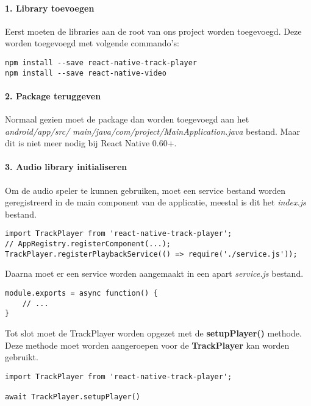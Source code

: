 \paragraph{1. Library toevoegen}
Eerst moeten de libraries aan de root van ons project worden toegevoegd. 
Deze worden toegevoegd met volgende commando's:
\begin{verbatim}
npm install --save react-native-track-player
npm install --save react-native-video
\end{verbatim}

\paragraph{2. Package teruggeven}
Normaal gezien moet de package dan worden toegevoegd aan het 
\textit{android/app/src/} \textit{main/java/com/project/MainApplication.java} bestand.
Maar dit is niet meer nodig bij React Native 0.60+.

\paragraph{3. Audio library initialiseren}
Om de audio speler te kunnen gebruiken, moet een service bestand worden geregistreerd in de main 
component van de applicatie, meestal is dit het \textit{index.js} bestand.
\begin{verbatim}
import TrackPlayer from 'react-native-track-player';
// AppRegistry.registerComponent(...);
TrackPlayer.registerPlaybackService(() => require('./service.js'));
\end{verbatim}
Daarna moet er een service worden aangemaakt in een apart \textit{service.js} bestand.
\begin{verbatim}
module.exports = async function() {
    // ...
}
\end{verbatim}
Tot slot moet de TrackPlayer worden opgezet met de \textbf{setupPlayer()} methode. Deze methode
moet worden aangeroepen voor de \textbf{TrackPlayer} kan worden gebruikt.
\begin{verbatim}
import TrackPlayer from 'react-native-track-player';

await TrackPlayer.setupPlayer()
\end{verbatim}

